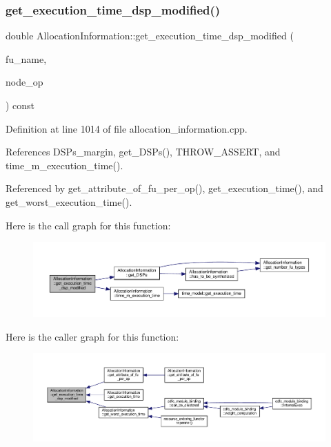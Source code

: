 \subsubsection{\texorpdfstring{get\+\_\+execution\+\_\+time\+\_\+dsp\+\_\+modified()}{get\_execution\_time\_dsp\_modified()}}
{\footnotesize\ttfamily double Allocation\+Information\+::get\+\_\+execution\+\_\+time\+\_\+dsp\+\_\+modified (\begin{DoxyParamCaption}\item[{const unsigned int}]{fu\+\_\+name,  }\item[{const \hyperlink{technology__node_8hpp_a33dd193b7bd6b987bf0d8a770a819fa7}{technology\+\_\+node\+Ref} \&}]{node\+\_\+op }\end{DoxyParamCaption}) const\hspace{0.3cm}{\ttfamily [private]}}



Definition at line 1014 of file allocation\+\_\+information.\+cpp.



References D\+S\+Ps\+\_\+margin, get\+\_\+\+D\+S\+Ps(), T\+H\+R\+O\+W\+\_\+\+A\+S\+S\+E\+RT, and time\+\_\+m\+\_\+execution\+\_\+time().



Referenced by get\+\_\+attribute\+\_\+of\+\_\+fu\+\_\+per\+\_\+op(), get\+\_\+execution\+\_\+time(), and get\+\_\+worst\+\_\+execution\+\_\+time().

Here is the call graph for this function\+:
\nopagebreak
\begin{figure}[H]
\begin{center}
\leavevmode
\includegraphics[width=350pt]{d7/d79/classAllocationInformation_a242d6db211604c5f03c4bbe79190086b_cgraph}
\end{center}
\end{figure}
Here is the caller graph for this function\+:
\nopagebreak
\begin{figure}[H]
\begin{center}
\leavevmode
\includegraphics[width=350pt]{d7/d79/classAllocationInformation_a242d6db211604c5f03c4bbe79190086b_icgraph}
\end{center}
\end{figure}
\mbox{\label{classAllocationInformation_a787dc8988eb46815a0ef63bc0457cfda}} 
